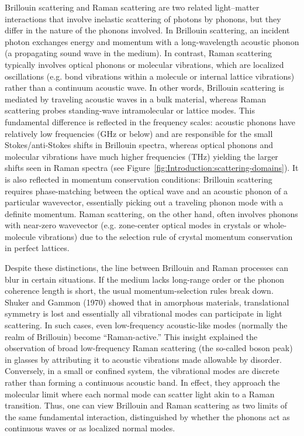 Brillouin scattering and Raman scattering are two related light–matter interactions that involve inelastic scattering of photons by phonons, but they differ in the nature of the phonons involved. In Brillouin scattering, an incident photon exchanges energy and momentum with a long-wavelength acoustic phonon (a propagating sound wave in the medium). In contrast, Raman scattering typically involves optical phonons or molecular vibrations, which are localized oscillations (e.g. bond vibrations within a molecule or internal lattice vibrations) rather than a continuum acoustic wave. In other words, Brillouin scattering is mediated by traveling acoustic waves in a bulk material, whereas Raman scattering probes standing-wave intramolecular or lattice modes. This fundamental difference is reflected in the frequency scales: acoustic phonons have relatively low frequencies (\si{\giga\hertz} or below) and are responsible for the small Stokes/anti-Stokes shifts in Brillouin spectra, whereas optical phonons and molecular vibrations have much higher frequencies (\si{\tera\hertz}) yielding the larger shifts seen in Raman spectra (see Figure~\ref{fig:Introduction:scattering-domains}). \cite{cardona2007light} It is also reflected in momentum conservation conditions: Brillouin scattering requires phase-matching between the optical wave and an acoustic phonon of a particular wavevector, essentially picking out a traveling phonon mode with a definite momentum. Raman scattering, on the other hand, often involves phonons with near-zero wavevector (e.g. zone-center optical modes in crystals or whole-molecule vibrations) due to the selection rule of crystal momentum conservation in perfect lattices. \cite{ferraro2003introductory}

Despite these distinctions, the line between Brillouin and Raman processes can blur in certain situations. If the medium lacks long-range order or the phonon coherence length is short, the usual momentum-selection rules break down. Shuker and Gammon (1970) \cite{shuker1970raman} showed that in amorphous materials, translational symmetry is lost and essentially all vibrational modes can participate in light scattering. In such cases, even low-frequency acoustic-like modes (normally the realm of Brillouin) become “Raman-active.” This insight explained the observation of broad low-frequency Raman scattering (the so-called boson peak) in glasses by attributing it to acoustic vibrations made allowable by disorder. \cite{duval1990vibrational, winterling1975very, nemanich1977low, martin1974model, malinovsky1986nature, buchenau1986low, malinovsky1987investigation, chumakov2011equivalence} Conversely, in a small or confined system, the vibrational modes are discrete rather than forming a continuous acoustic band. In effect, they approach the molecular limit where each normal mode can scatter light akin to a Raman transition. Thus, one can view Brillouin and Raman scattering as two limits of the same fundamental interaction, distinguished by whether the phonons act as continuous waves or as localized normal modes.

